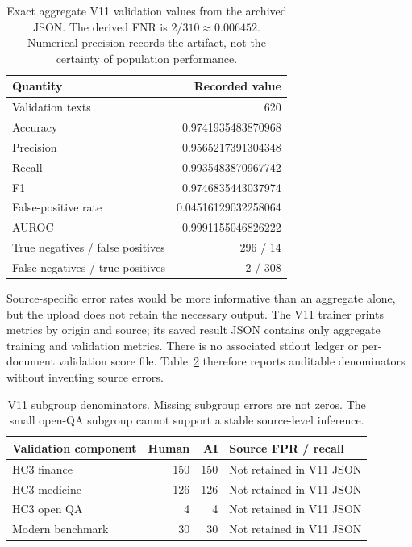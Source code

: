 \documentclass[11pt]{article}
\begin{document}
\begin{table}[htbp]
\centering\small
\begin{tabular}{lr}
\toprule
Quantity & Recorded value \\
\midrule
Validation texts & 620 \\
Accuracy & 0.9741935483870968 \\
Precision & 0.9565217391304348 \\
Recall & 0.9935483870967742 \\
F1 & 0.9746835443037974 \\
False-positive rate & 0.04516129032258064 \\
AUROC & 0.9991155046826222 \\
True negatives / false positives & 296 / 14 \\
False negatives / true positives & 2 / 308 \\
\bottomrule
\end{tabular}
\caption{Exact aggregate V11 validation values from the archived JSON.
The derived FNR is $2/310\approx0.006452$. Numerical precision records the
artifact, not the certainty of population performance.}
\label{tab:v11metrics}
\end{table}

Source-specific error rates would be more informative than an aggregate
alone, but the upload does not retain the necessary output. The V11 trainer
prints metrics by origin and source; its saved result JSON contains only
aggregate training and validation metrics. There is no associated stdout
ledger or per-document validation score file. Table~\ref{tab:subgroups}
therefore reports auditable denominators without inventing source errors.

\begin{table}[htbp]
\centering\small
\begin{tabular}{lrrl}
\toprule
Validation component & Human & AI & Source FPR / recall \\
\midrule
HC3 finance & 150 & 150 & Not retained in V11 JSON \\
HC3 medicine & 126 & 126 & Not retained in V11 JSON \\
HC3 open QA & 4 & 4 & Not retained in V11 JSON \\
Modern benchmark & 30 & 30 & Not retained in V11 JSON \\
\bottomrule
\end{tabular}
\caption{V11 subgroup denominators. Missing subgroup errors are not zeros.
The small open-QA subgroup cannot support a stable source-level inference.}
\label{tab:subgroups}
\end{table}
\end{document}
